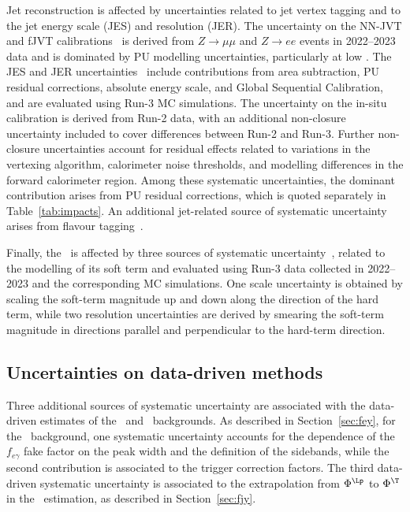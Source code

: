 Jet reconstruction is affected by uncertainties related to jet vertex tagging and to the jet energy scale (JES) and resolution (JER). The uncertainty on the NN-JVT and fJVT calibrations~\cite{PERF-2014-03,PERF-2016-06} is derived from $Z\to\mu\mu$ and $Z\to ee$ events in 2022--2023 data and is dominated by PU modelling uncertainties,  particularly at low \pT.  
The JES and JER uncertainties~\cite{PERF-2014-07,PERF-2015-09,JETM-2018-05} include contributions from area subtraction, PU residual corrections, absolute energy scale, and Global Sequential Calibration, and are evaluated using Run-3 MC simulations. The uncertainty on the in-situ calibration is derived from Run-2 data, with an additional non-closure uncertainty included to cover differences between Run-2 and Run-3. Further non-closure uncertainties account for residual effects related to variations in the vertexing algorithm, calorimeter noise thresholds, and modelling differences in the forward calorimeter region. Among these systematic uncertainties, the dominant contribution arises from PU residual corrections, which is quoted separately in Table~\ref{tab:impacts}. An additional jet-related source of systematic uncertainty arises from flavour tagging~\cite{FTAG-2018-01}.

Finally, the \ETmiss\ is affected by three sources of systematic uncertainty~\cite{JETM-2020-03,Balunas:2023fpu}, related to the modelling of its soft term and evaluated using Run-3 data collected in 2022--2023 and the corresponding MC simulations. One scale uncertainty is obtained by scaling the soft-term magnitude up and down along the direction of the hard term, while two resolution uncertainties are derived by smearing the soft-term magnitude in directions parallel and perpendicular to the hard-term direction.


\subsection{Uncertainties on data-driven methods}
Three additional sources of systematic uncertainty are associated with the data-driven estimates of the \efakey\ and \jfakey\ backgrounds.
As described in Section~\ref{sec:fey}, for the \efakey\ background, one systematic uncertainty accounts for the dependence of the $f_{e\gamma}$ fake factor on the peak width and the definition of the sidebands, while the second contribution is associated to the trigger correction factors. %
The third data-driven systematic uncertainty is associated to the extrapolation from $\Phi^\Lp$ to $\Phi^\T$ in the \jfakey\ estimation, 
as described in Section~\ref{sec:fjy}.

